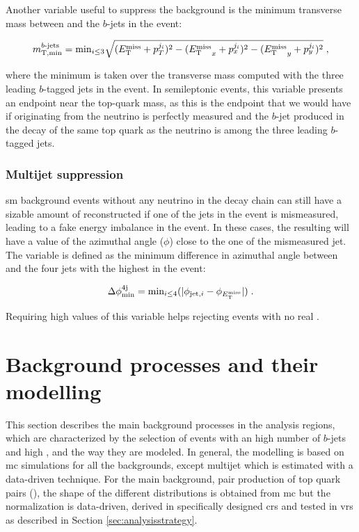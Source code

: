 Another variable useful to suppress the \ttbar background is the minimum transverse mass between \met and the $b$-jets in the event:

\begin{equation}
\label{eq:mtbmin}
m_{\mathrm{T, min}}^{b\textrm{-jets}} =  \mathrm{min}_{i\leq 3}  \sqrt{(E_{\rm T}^{\mathrm{miss}}+p_T^{j_i})^2 - ({E_{\rm T}^{\mathrm{miss}}}_x+p_x^{j_i})^2 - ({E_{\rm T}^{\mathrm{miss}}}_y+p_y^{j_i})^2 } \; ,
\end{equation}

\noindent where the minimum is taken over the transverse mass computed with the three leading $b$-tagged jets in the event. 
In semileptonic \ttbar events, this variable presents an endpoint near the top-quark mass, as this is the endpoint that we would have if \met originating from the neutrino is perfectly measured and the $b$-jet produced in the decay of the same top quark as the neutrino is among the three leading $b$-tagged jets. 


\subsubsection*{Multijet suppression}

\gls{sm} background events without any neutrino in the decay chain can still have a sizable amount of reconstructed \met if one of the jets in the 
event is mismeasured, leading to a fake energy imbalance in the event. In these cases, the resulting \met will have a value of the azimuthal angle ($\phi$) close to the one of the mismeasured jet. The variable \dphimin is defined as the minimum difference in azimuthal angle between \met and the  four jets with the highest \pt in the event:

\begin{equation}
\Delta\phi_{\rm{min}}^{4{\rm{j}}} = \textrm{min}_{i \leq 4}(|\phi_{{\rm{jet},}i} - \phi_{E_{\rm T}^{\mathrm{miss}}}|) \; .
\end{equation}

\noindent Requiring high values of this variable helps rejecting events with no real \met. 


\section{Background processes and their modelling}
\label{sec:common_backgrounds}

This section describes the main background processes in the analysis regions, 
which are characterized by the selection of events with an high number of $b$-jets and high \met, and the way they are modeled. 
In general, the modelling is based on \gls{mc} simulations for
all the backgrounds, except multijet which is estimated with a data-driven technique.
For the main background, pair production of top quark pairs (\ttbar), the shape of the different distributions is obtained from \gls{mc}
but the normalization is data-driven, derived in specifically designed \glspl{cr} and tested in \glspl{vr} as described in Section \ref{sec:analysisstrategy}.

